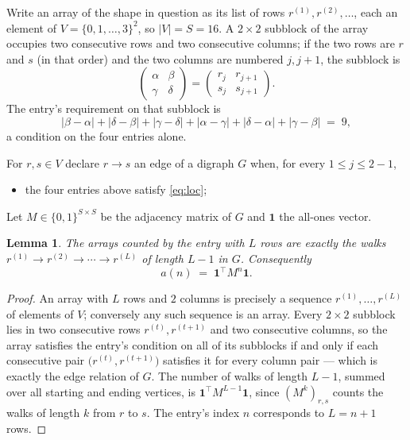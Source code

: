\documentclass[11pt,a4paper]{article}
\theoremstyle{plain}
\newtheorem{lemma}[theorem]{Lemma}
\theoremstyle{definition}
\begin{document}
Write an array of the shape in question as its list of rows
$r^{(1)},r^{(2)},\dots$, each an element of
$V=\{0,1,\dots,3\}^{2}$, so $|V|=S=16$. A $2\times2$ subblock of the array
occupies two consecutive rows and two consecutive columns; if the two rows are $r$
and $s$ (in that order) and the two columns are numbered $j,j+1$,
the subblock is
\[
\begin{pmatrix}\alpha&\beta\\\gamma&\delta\end{pmatrix}=\begin{pmatrix}r_j&r_{j+1}\\s_j&s_{j+1}\end{pmatrix}.
\]
The entry's requirement on that subblock is
\begin{equation}\label{eq:loc}
|\beta-\alpha|+|\delta-\beta|+|\gamma-\delta|+|\alpha-\gamma|+|\delta-\alpha|+|\gamma-\beta|\;=\;9,
\end{equation}
a condition on the four entries alone.

For $r,s\in V$ declare $r\to s$ an edge of a digraph $G$ when, for every
$1\le j\le 2-1$,
\begin{itemize}
\item the four entries above satisfy \eqref{eq:loc};

\end{itemize}
Let $M\in\{0,1\}^{S\times S}$ be the adjacency matrix of $G$ and $\mathbf{1}$ the
all-ones vector.

\begin{lemma}\label{lem:walk}
The arrays counted by the entry with $L$ rows are exactly the walks
$r^{(1)}\to r^{(2)}\to\cdots\to r^{(L)}$ of length $L-1$ in $G$. Consequently
\[
a(n)\;=\;\mathbf{1}^{\!\top}M^{n}\mathbf{1} .
\]
\end{lemma}

\begin{proof}
An array with $L$ rows and $2$ columns is precisely a sequence
$r^{(1)},\dots,r^{(L)}$ of elements of $V$; conversely any such sequence is an array.
Every $2\times2$ subblock lies in two consecutive rows $r^{(t)},r^{(t+1)}$ and two
consecutive columns, so the array satisfies the entry's condition on all of its subblocks
if and only if each consecutive pair $\bigl(r^{(t)},r^{(t+1)}\bigr)$ satisfies it for
every column pair --- which is exactly the edge relation of $G$. The number of walks of
length $L-1$, summed over all starting and ending vertices, is
$\mathbf{1}^{\!\top}M^{L-1}\mathbf{1}$, since $(M^{k})_{r,s}$ counts the walks of
length $k$ from $r$ to $s$. The entry's index $n$ corresponds to $L=n+1$ rows.
\end{proof}
\end{document}
